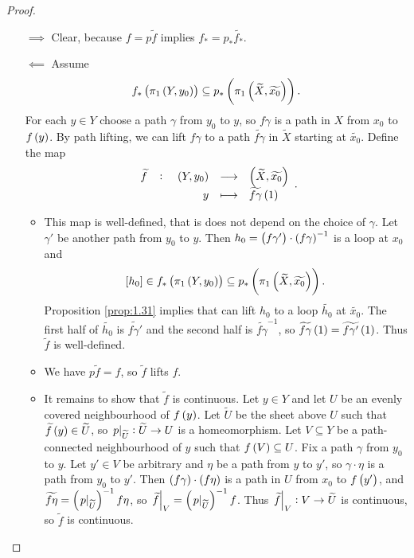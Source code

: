 \pagebreak

\begin{proof}
\hfill
\begin{itemize}
\item[$ \implies $] Clear, because $ f = p\widetilde{f} $ implies $ f_* = p_*\widetilde{f_*} $.
\item[$ \impliedby $] Assume
$$ f_*\br{\pi_1\br{Y, y_0}} \subseteq p_*\br{\pi_1\br{\widetilde{X}, \widetilde{x_0}}}. $$
For each $ y \in Y $ choose a path $ \gamma $ from $ y_0 $ to $ y $, so $ f\gamma $ is a path in $ X $ from $ x_0 $ to $ f\br{y} $. By path lifting, we can lift $ f\gamma $ to a path $ \widetilde{f\gamma} $ in $ \widetilde{X} $ starting at $ \widetilde{x_0} $. Define the map
$$ \function[\widetilde{f}]{\br{Y, y_0}}{\br{\widetilde{X}, \widetilde{x_0}}}{y}{\widetilde{f\gamma}\br{1}}. $$
\begin{itemize}
\item This map is well-defined, that is does not depend on the choice of $ \gamma $. Let $ \gamma' $ be another path from $ y_0 $ to $ y $. Then $ h_0 = \br{f\gamma'} \cdot \br{f\gamma}^{-1} $ is a loop at $ x_0 $ and
$$ \sbr{h_0} \in f_*\br{\pi_1\br{Y, y_0}} \subseteq p_*\br{\pi_1\br{\widetilde{X}, \widetilde{x_0}}}. $$
Proposition \ref{prop:1.31} implies that can lift $ h_0 $ to a loop $ \widetilde{h_0} $ at $ \widetilde{x_0} $. The first half of $ \widetilde{h_0} $ is $ \widetilde{f\gamma'} $ and the second half is $ \widetilde{f\gamma}^{-1} $, so $ \widetilde{f\gamma}\br{1} = \widetilde{f\gamma'}\br{1} $. Thus $ \widetilde{f} $ is well-defined.
\item We have $ p\widetilde{f} = f $, so $ \widetilde{f} $ lifts $ f $.
\item It remains to show that $ \widetilde{f} $ is continuous. Let $ y \in Y $ and let $ U $ be an evenly covered neighbourhood of $ f\br{y} $. Let $ \widetilde{U} $ be the sheet above $ U $ such that $ \widetilde{f}\br{y} \in \widetilde{U} $, so $ \left. p \right|_{\widetilde{U}} : \widetilde{U} \to U $ is a homeomorphism. Let $ V \subseteq Y $ be a path-connected neighbourhood of $ y $ such that $ f\br{V} \subseteq U $. Fix a path $ \gamma $ from $ y_0 $ to $ y $. Let $ y' \in V $ be arbitrary and $ \eta $ be a path from $ y $ to $ y' $, so $ \gamma \cdot \eta $ is a path from $ y_0 $ to $ y' $. Then $ \br{f\gamma} \cdot \br{f\eta} $ is a path in $ U $ from $ x_0 $ to $ f\br{y'} $, and $ \widetilde{f\eta} = \br{\eval{p}_{\widetilde{U}}}^{-1}f\eta $, so $ \eval{\widetilde{f}}_V = \br{\eval{p}_{\widetilde{U}}}^{-1}f $. Thus $ \left. \widetilde{f} \right|_V : V \to \widetilde{U} $ is continuous, so $ \widetilde{f} $ is continuous.
\end{itemize}
\end{itemize}
\end{proof}

